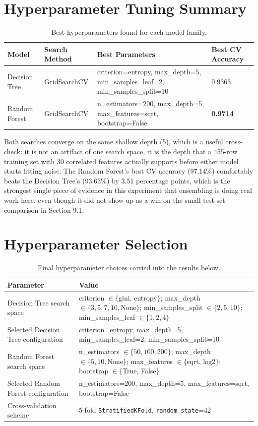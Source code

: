\documentclass[11pt,a4paper]{article}
\begin{document}
\section{Hyperparameter Tuning Summary}
\begin{table}[h]
\centering
\small
\begin{tabular}{@{}p{2.1cm}p{2.3cm}p{7cm}p{1.9cm}@{}}
\toprule
Model & Search Method & Best Parameters & Best CV Accuracy \\
\midrule
Decision Tree & GridSearchCV & criterion=entropy, max\_depth=5, min\_samples\_leaf=2, min\_samples\_split=10 & 0.9363 \\
Random Forest & GridSearchCV & n\_estimators=200, max\_depth=5, max\_features=sqrt, bootstrap=False & \textbf{0.9714} \\
\bottomrule
\end{tabular}
\caption{Best hyperparameters found for each model family.}
\end{table}
Both searches converge on the same shallow depth (5), which is a useful cross-check: it is not an artifact of one search space, it is the depth that a 455-row training set with 30 correlated features actually supports before either model starts fitting noise. The Random Forest's best CV accuracy (97.14\%) comfortably beats the Decision Tree's (93.63\%) by 3.51 percentage points, which is the strongest single piece of evidence in this experiment that ensembling is doing real work here, even though it did not show up as a win on the small test-set comparison in Section 9.1.

\section{Hyperparameter Selection}
\begin{table}[h]
\centering
\begin{tabular}{@{}p{4.3cm}p{8.5cm}@{}}
\toprule
Parameter & Value \\
\midrule
Decision Tree search space & criterion $\in \{$gini, entropy$\}$; max\_depth $\in \{3,5,7,10,\text{None}\}$; min\_samples\_split $\in \{2,5,10\}$; min\_samples\_leaf $\in \{1,2,4\}$ \\
Selected Decision Tree configuration & criterion=entropy, max\_depth=5, min\_samples\_leaf=2, min\_samples\_split=10 \\
Random Forest search space & n\_estimators $\in \{50,100,200\}$; max\_depth $\in \{5,10,\text{None}\}$; max\_features $\in \{$sqrt, log2$\}$; bootstrap $\in \{$True, False$\}$ \\
Selected Random Forest configuration & n\_estimators=200, max\_depth=5, max\_features=sqrt, bootstrap=False \\
Cross-validation scheme & 5-fold \texttt{StratifiedKFold}, \texttt{random\_state}=42 \\
\bottomrule
\end{tabular}
\caption{Final hyperparameter choices carried into the results below.}
\end{table}
\end{document}
